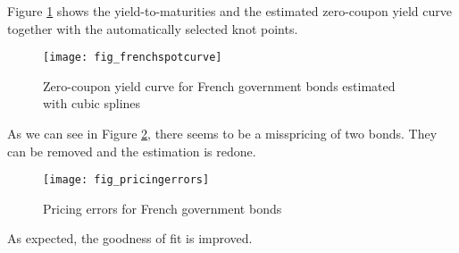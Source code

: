 
Figure \ref{fig:frenchspotcurve} shows the yield-to-maturities and the estimated zero-coupon yield curve together with the automatically selected knot points.

\begin{figure}[htb]
\centering
\caption{Zero-coupon yield curve for French government bonds estimated with cubic splines}
\label{fig:frenchspotcurve}
\texttt{[image: fig\_frenchspotcurve]}
\end{figure}



As we can see in Figure \ref{fig:pricingerrors}, there seems to be a misspricing of two bonds. They can be removed and the estimation is redone.

\begin{figure}[htb]
\centering  
\caption{Pricing errors for French government bonds} 
\label{fig:pricingerrors}
\texttt{[image: fig\_pricingerrors]}
\end{figure}

As expected, the goodness of fit is improved.

